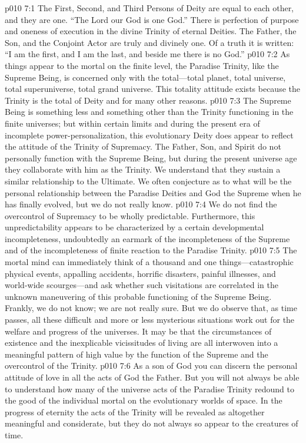 \vs p010 7:1 The First, Second, and Third Persons of Deity are equal to each other, and they are one. “The Lord our God is one God.” There is perfection of purpose and oneness of execution in the divine Trinity of eternal Deities. The Father, the Son, and the Conjoint Actor are truly and divinely one. Of a truth it is written: “I am the first, and I am the last, and beside me there is no God.”
\pc \vs p010 7:2 As things appear to the mortal on the finite level, the Paradise Trinity, like the Supreme Being, is concerned only with the total---total planet, total universe, total superuniverse, total grand universe. This totality attitude exists because the Trinity is the total of Deity and for many other reasons.
\vs p010 7:3 The Supreme Being is something less and something other than the Trinity functioning in the finite universes; but within certain limits and during the present era of incomplete power\hyp{}personalization, this evolutionary Deity does appear to reflect the attitude of the Trinity of Supremacy. The Father, Son, and Spirit do not personally function with the Supreme Being, but during the present universe age they collaborate with him as the Trinity. We understand that they sustain a similar relationship to the Ultimate. We often conjecture as to what will be the personal relationship between the Paradise Deities and God the Supreme when he has finally evolved, but we do not really know.
\pc \vs p010 7:4 We do not find the overcontrol of Supremacy to be wholly predictable. Furthermore, this unpredictability appears to be characterized by a certain developmental incompleteness, undoubtedly an earmark of the incompleteness of the Supreme and of the incompleteness of finite reaction to the Paradise Trinity.
\vs p010 7:5 The mortal mind can immediately think of a thousand and one things---catastrophic physical events, appalling accidents, horrific disasters, painful illnesses, and world\hyp{}wide scourges---and ask whether such visitations are correlated in the unknown maneuvering of this probable functioning of the Supreme Being. Frankly, we do not know; we are not really sure. But we do observe that, as time passes, all these difficult and more or less mysterious situations  work out for the welfare and progress of the universes. It may be that the circumstances of existence and the inexplicable vicissitudes of living are all interwoven into a meaningful pattern of high value by the function of the Supreme and the overcontrol of the Trinity.
\vs p010 7:6 As a son of God you can discern the personal attitude of love in all the acts of God the Father. But you will not always be able to understand how many of the universe acts of the Paradise Trinity redound to the good of the individual mortal on the evolutionary worlds of space. In the progress of eternity the acts of the Trinity will be revealed as altogether meaningful and considerate, but they do not always so appear to the creatures of time.\plusone
